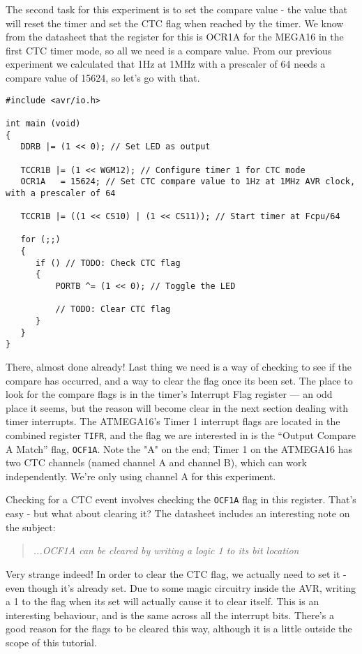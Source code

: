 \documentclass[a4paper,oneside]{book}
\begin{document}
The second task for this experiment is to set the compare value - the value that will reset the timer and set the CTC flag when reached by the timer. We know from the datasheet that the register for this is OCR1A for the MEGA16 in the first CTC timer mode, so all we need is a compare value. From our previous experiment we calculated that 1Hz at 1MHz with a prescaler of 64 needs a compare value of 15624, so let's go with that.

\begin{center}
\begin{lstlisting}
#include <avr/io.h>

int main (void)
{
   DDRB |= (1 << 0); // Set LED as output

   TCCR1B |= (1 << WGM12); // Configure timer 1 for CTC mode
   OCR1A   = 15624; // Set CTC compare value to 1Hz at 1MHz AVR clock, with a prescaler of 64

   TCCR1B |= ((1 << CS10) | (1 << CS11)); // Start timer at Fcpu/64

   for (;;)
   {
      if () // TODO: Check CTC flag
      {
          PORTB ^= (1 << 0); // Toggle the LED

          // TODO: Clear CTC flag
      }
   }
}
\end{lstlisting}
\end{center}

There, almost done already! Last thing we need is a way of checking to see if the compare has occurred, and a way to clear the flag once its been set. The place to look for the compare flags is in the timer's Interrupt Flag register --- an odd place it seems, but the reason will become clear in the next section dealing with timer interrupts. The ATMEGA16's Timer 1 interrupt flags are located in the combined register \texttt{TIFR}, and the flag we are interested in is the ``Output Compare A Match'' flag, \texttt{OCF1A}. Note the "A" on the end; Timer 1 on the ATMEGA16 has two CTC channels (named channel A and channel B), which can work independently. We're only using channel A for this experiment.

Checking for a CTC event involves checking the \texttt{OCF1A} flag in this register. That's easy - but what about clearing it? The datasheet includes an interesting note on the subject:

\begin{quote}
\emph{...OCF1A can be cleared by writing a logic 1 to its bit location}
\end{quote}

Very strange indeed! In order to clear the CTC flag, we actually need to set it - even though it's already set. Due to some magic circuitry inside the AVR, writing a 1 to the flag when its set will actually cause it to clear itself. This is an interesting behaviour, and is the same across all the interrupt bits. There's a good reason for the flags to be cleared this way, although it is a little outside the scope of this tutorial.
\end{document}
